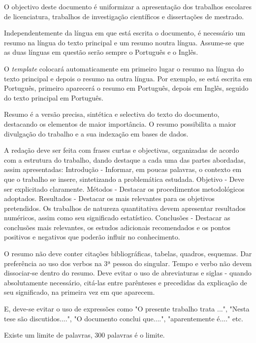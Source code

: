 \abstractPT  %

O objectivo deste documento é uniformizar a apresentação dos trabalhos escolares de licenciatura, trabalhos de investigação científicos e dissertações de mestrado.

Independentemente da língua em que está escrita o documento, é necessário um resumo na língua do texto principal e um resumo noutra língua.  Assume-se que as duas línguas em questão serão sempre o Português e o Inglês.

O \emph{template} colocará automaticamente em primeiro lugar o resumo na língua do texto principal e depois o resumo na outra língua.  Por exemplo, se  está escrita em Português, primeiro aparecerá o resumo em Português, depois em Inglês, seguido do texto principal em Português. 

Resumo é a versão precisa, sintética e selectiva do texto do documento, destacando os elementos de maior importância. O resumo possibilita a maior divulgação do trabalho e a sua indexação em bases de dados.

A redação deve ser feita com frases curtas e objectivas, organizadas de acordo com a estrutura do trabalho, dando destaque a cada uma das partes abordadas, assim apresentadas: Introdução - Informar, em poucas palavras, o contexto em que o trabalho se insere, sintetizando a problemática estudada. Objetivo - Deve ser explicitado claramente. Métodos - Destacar os procedimentos metodológicos adoptados. Resultados - Destacar os mais relevantes para os objetivos pretendidos. Os trabalhos de natureza quantitativa devem apresentar resultados numéricos, assim como seu significado estatístico. Conclusões - Destacar as conclusões mais relevantes, os estudos adicionais recomendados e os pontos positivos e negativos que poderão influir no conhecimento. 

O resumo não deve conter citações bibliográficas, tabelas, quadros, esquemas. Dar preferência ao uso dos verbos na 3ª pessoa do singular. Tempo e verbo não devem dissociar-se dentro do resumo. Deve evitar o uso de abreviaturas e siglas - quando absolutamente necessário, citá-las entre parênteses e precedidas da explicação de seu significado, na primeira vez em que aparecem. 

E, deve-se evitar o uso de expressões como "O presente trabalho trata ...", "Nesta tese são discutidos....", "O documento conclui que....", "aparentemente é...." etc. 

Existe um limite de palavras, 300 palavras é o limite.

